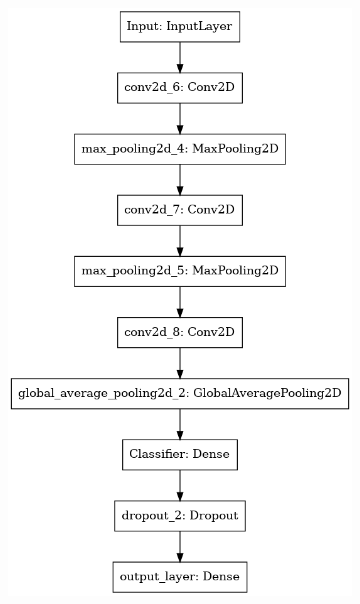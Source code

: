 \documentclass[a4paper,12pt]{article}
\numberwithin{equation}{section}
\begin{document}
\begin{figure}[h]
\begin{subfigure}{0.4\textwidth}
            \includegraphics[scale=0.15]{model_noaug.png}
      \end{subfigure}
\end{figure}
\end{document}
